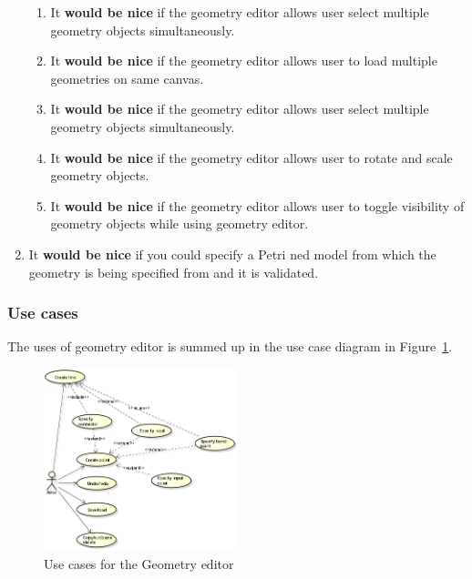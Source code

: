 \begin{enumerate}
\begin{enumerate}
		\item It \textbf{would be nice} if the geometry editor allows user select multiple geometry objects simultaneously.
		\item It \textbf{would be nice} if the geometry editor allows user to load multiple geometries on same canvas.
		\item It \textbf{would be nice} if the geometry editor allows user select multiple geometry objects simultaneously.
		\item It \textbf{would be nice} if the geometry editor allows user to rotate and scale geometry objects.
		\item It \textbf{would be nice} if the geometry editor allows user to toggle visibility of geometry objects while using geometry editor.
	\end{enumerate}
	\item It \textbf{would be nice} if you could specify a Petri ned model from which the geometry is being specified from and it is validated.
\end{enumerate}

\subsubsection{Use cases}

The uses of geometry editor is summed up in the use case diagram in Figure~\ref{fig:use-cases-geometry-editor}.

\begin{figure}[htp]
\begin{center}
  \includegraphics[width=0.5\textwidth]{image/uc-geometry.png}
  \caption{Use cases for the Geometry editor}
  \label{fig:use-cases-geometry-editor}
\end{center}
\end{figure}